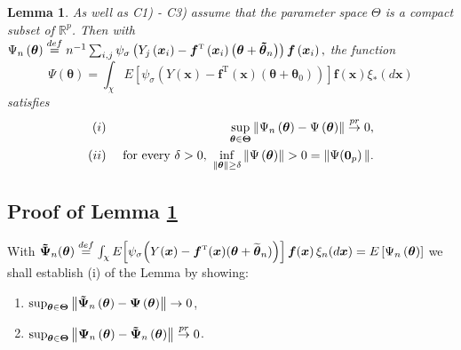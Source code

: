 \documentclass[10pt,a4paper]{amsart}
\def\T{{ \mathrm{\scriptscriptstyle T} }}
\theoremstyle{plain}
\newtheorem{lemma}[theorem]{Lemma}
\theoremstyle{definition}
\theoremstyle{remark}
\begin{document}
\begin{lemma}
\label{lemma: limit} As well as C1) - C3) assume that the parameter space $%
\Theta $ is a compact subset of $\mathbb{R}^{p}$. Then with $\Psi _{n}\left( 
\boldsymbol{\theta }\right) \overset{def}{=}n^{-1}\sum_{i,j}\psi _{\sigma
}\left( Y_{j}\left( \boldsymbol{x}_{i}\right) -\boldsymbol{f}^{\T
}\left( \boldsymbol{x}_{i}\right) \left( \boldsymbol{\theta }+\boldsymbol{%
\tilde{\theta}}_{n}\right) \right) \boldsymbol{f}\left( \boldsymbol{x}%
_{i}\right) ,$ the function 
\begin{equation*}
\Psi \left( \boldsymbol{\theta }\right) =\int_{\mathcal{\chi }}E\left[ \psi
_{\sigma }\left( Y\left( \boldsymbol{x}\right) -\boldsymbol{f}^{\T
}\left( \boldsymbol{x}\right) \left( \boldsymbol{\theta }+\boldsymbol{\theta 
}_{0}\right) \right) \right] \boldsymbol{f}\left( \boldsymbol{x}\right) \xi
_{\ast }\left( d\boldsymbol{x}\right)
\end{equation*}%
satisfies 
\begin{eqnarray*}
(i) &&\sup_{\boldsymbol{\theta }\in \boldsymbol{\Theta }}\left\Vert \Psi _{n}\left( \boldsymbol{%
\theta }\right) -\Psi \left( \boldsymbol{\theta }\right) \right\Vert \overset%
{pr}{\rightarrow }0, \\
(ii) &\text{ }&\text{for every }\delta >0\text{, }\inf_{\left\Vert 
\boldsymbol{\theta }\right\Vert \geq \delta }\left\Vert \Psi \left( 
\boldsymbol{\theta }\right) \right\Vert >0=\left\Vert\Psi ( \boldsymbol{0}_p\right)\Vert
.
\end{eqnarray*}
\end{lemma}

\subsection{Proof of Lemma \protect\ref{lemma: limit}}

With $\boldsymbol{\tilde{\Psi}}_{n}(\boldsymbol{\theta })\overset{def}{=}%
\int_{\chi }E\!\left[ \psi _{\sigma }\!\left( Y(\boldsymbol{x})-\boldsymbol{f%
}^{\T }(\boldsymbol{x})(\boldsymbol{\theta }+\widetilde{\boldsymbol{%
\theta }}_{n})\right) \right] \boldsymbol{f}(\boldsymbol{x})\,\xi _{n}(d%
\boldsymbol{x})=E\left[ \Psi _{n}\left( \boldsymbol{\theta }\right) \right] $
we shall establish (i) of the Lemma by showing:

\begin{enumerate}
\item[(a)] $\sup_{\boldsymbol{\theta }\in \boldsymbol{\Theta }}\left\Vert 
\boldsymbol{\tilde{\Psi}}_{n}\left( \boldsymbol{\theta }\right) -\boldsymbol{%
\Psi }\left( \boldsymbol{\theta }\right) \right\Vert \rightarrow 0$,

\item[(b)] $\sup_{\boldsymbol{\theta }\in \boldsymbol{\Theta }}\left\Vert 
\boldsymbol{\Psi }_{n}\left( \boldsymbol{\theta }\right) -\boldsymbol{\tilde{%
\Psi}}_{n}\left( \boldsymbol{\theta }\right) \right\Vert \overset{pr}{%
\rightarrow }0$.
\end{enumerate}
\end{document}

